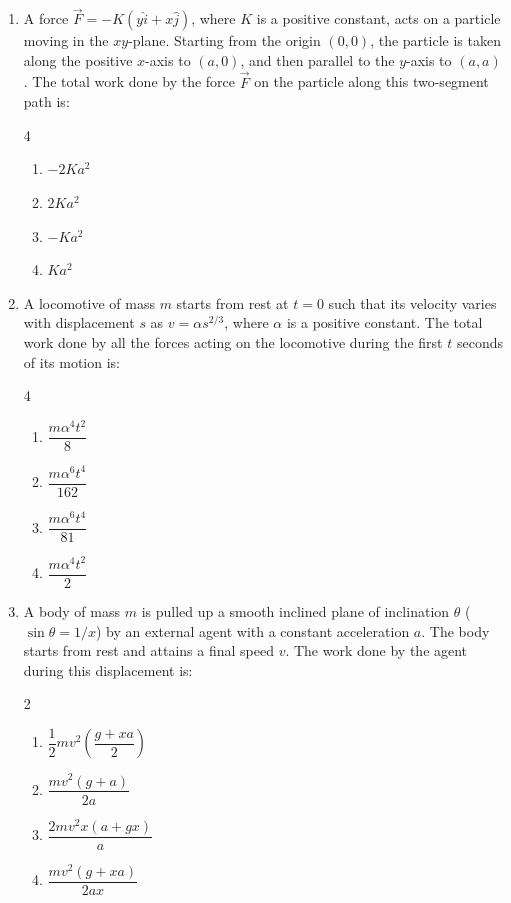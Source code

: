 \documentclass[11pt,a4paper]{article}
\begin{document}
\begin{enumerate}[label=\textbf{\arabic*.},leftmargin=18pt,itemsep=8pt,resume]

  \item A force $\vec{F} = -K(y\hat{i} + x\hat{j})$, where $K$ is a positive constant, acts on a particle moving in the $xy$-plane. Starting from the origin $(0,0)$, the particle is taken along the positive $x$-axis to $(a,0)$, and then parallel to the $y$-axis to $(a, a)$. The total work done by the force $\vec{F}$ on the particle along this two-segment path is:
  \begin{multicols}{4}
    \begin{enumerate}[label=(\Alph*)]
      \item $-2Ka^2$
      \item $2Ka^2$
      \item $-Ka^2$
      \item $Ka^2$
    \end{enumerate}
  \end{multicols}

  \item A locomotive of mass $m$ starts from rest at $t = 0$ such that its velocity varies with displacement $s$ as $v = \alpha s^{2/3}$, where $\alpha$ is a positive constant. The total work done by all the forces acting on the locomotive during the first $t$ seconds of its motion is:
  \begin{multicols}{4}
    \begin{enumerate}[label=(\Alph*)]
      \item $\dfrac{m\alpha^4 t^2}{8}$
      \item $\dfrac{m\alpha^6 t^4}{162}$
      \item $\dfrac{m\alpha^6 t^4}{81}$
      \item $\dfrac{m\alpha^4 t^2}{2}$
    \end{enumerate}
  \end{multicols}

  \item A body of mass $m$ is pulled up a smooth inclined plane of inclination $\theta$ ($\sin\theta = 1/x$) by an external agent with a constant acceleration $a$. The body starts from rest and attains a final speed $v$. The work done by the agent during this displacement is:
  \begin{multicols}{2}
    \begin{enumerate}[label=(\Alph*)]
      \item $\dfrac{1}{2}mv^2\left(\dfrac{g + xa}{2}\right)$
      \item $\dfrac{mv^2(g + a)}{2a}$
      \item $\dfrac{2mv^2 x(a + gx)}{a}$
      \item $\dfrac{mv^2(g + xa)}{2ax}$
    \end{enumerate}
  \end{multicols}


\end{enumerate}
\end{document}
